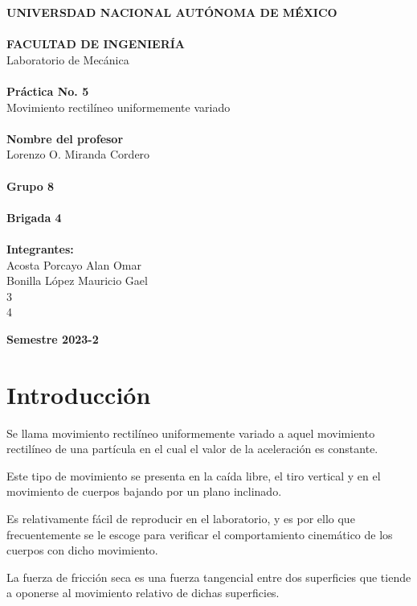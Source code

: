 \documentclass[12pt, titlepage]{report}
\begin{document}
\begin{titlepage}
\begin{center}
            \large \textbf{UNIVERSDAD NACIONAL AUTÓNOMA DE MÉXICO\\}
            \textbf{\\FACULTAD DE INGENIERÍA\\} 
            \hfill \break
            Laboratorio de Mecánica\\
            \Large \textbf{\\Práctica No. 5\\}
            \large Movimiento rectilíneo uniformemente variado\\
            \Large \textbf{\\Nombre del profesor\\}
            \large Lorenzo O. Miranda Cordero\\
            \Large \textbf{\\Grupo 8\\}
            \textbf{\\Brigada 4\\}
            \textbf{\\Integrantes:\\}
            Acosta Porcayo Alan Omar\\
            Bonilla López Mauricio Gael\\
            3\\
            4\\
        \end{center}
        \begin{flushright}
            \Large \textbf{Semestre 2023-2}
        \end{flushright}
    \end{titlepage}

    \section*{Introducción}
    Se llama movimiento rectilíneo uniformemente variado a aquel movimiento rectilíneo de una partícula en el cual el valor de la aceleración es constante.

    Este tipo de movimiento se presenta en la caída libre, el tiro vertical y en el movimiento de cuerpos bajando por un plano inclinado.

    Es relativamente fácil de reproducir en el laboratorio, y es por ello que frecuentemente se le escoge para verificar el comportamiento cinemático de los cuerpos con dicho movimiento.

    La fuerza de fricción seca es una fuerza tangencial entre dos superficies que tiende a oponerse al movimiento relativo de dichas superficies.
\end{document}
